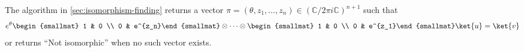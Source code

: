 \begin{theorem}
	The algorithm in \autoref{sec:isomorphism-finding} returns a vector $\pi=(\theta,z_1,\ldots, z_n)\in (\mathbb C/2\pi i\mathbb C)^{n+1}$ such that
	\begin{align}
		e^\theta \begin{smallmat} 1 & 0 \\ 0 & e^{z_n}\end{smallmat}\otimes\cdots\otimes \begin{smallmat} 1 & 0 \\ 0 & e^{z_1}\end{smallmat}\ket{u} = \ket{v}
	\end{align}
	or returns ``Not isomorphic'' when no such vector exists.
\end{theorem}

